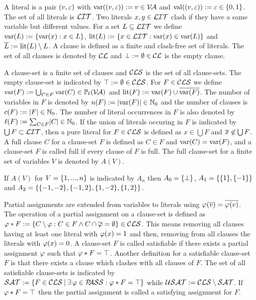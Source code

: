 \documentclass[]{book}
\begin{document}
A literal is a pair $(v,\varepsilon)$ with $\operatorname{var}((v,\varepsilon)):=v \in \mathcal{V\hspace{-0.1em}A}$ and $\operatorname{val}((v,\varepsilon)):=\varepsilon \in \{0,1\}$. The set of all literals is $\mathcal{LIT}$. Two literals $x, y \in \mathcal{LIT}$ clash if they have a same variable but different values. For a set $L \subseteq \mathcal{LIT}$ we define $\operatorname{var}(L) := \{ \operatorname{var}(x) : x \in L \}$, $\operatorname{lit}(L):= \{ x \in \mathcal{LIT} : \operatorname{var}(x) \in \operatorname{var}(L) \}$ and $\overline{L} := \operatorname{lit}(L) \setminus L$. A clause is defined as a finite and clash-free set of literals. The set of all clauses is denoted by $\mathcal{CL}$ and $\bot := \emptyset \in \mathcal{CL}$ is the empty clause. 

A clause-set is a finite set of clauses and $\mathcal{CLS}$ is the set of all clause-sets. The empty clause-set is indicated by $\top := \emptyset \in \mathcal{CLS}$. For $F \in \mathcal{CLS}$ we define $\operatorname{var}(F) := \bigcup_{C \in F} \operatorname{var}(C) \in \operatorname{\mathbb{P}_f}(\mathcal{V\hspace{-0.1em}A})$ and $\operatorname{lit}(F) := \operatorname{var}(F) \cup \overline{\operatorname{var}(F)}$. The number of variables in $F$ is denoted by $n(F) := \lvert \operatorname{var}(F) \rvert \in \mathbb{N}_0$ and the number of clauses is $c(F) := \lvert F \rvert \in \mathbb{N}_0$. The number of literal occurrences in $F$ is also denoted by $\ell(F) := \sum_{C \in F} \lvert C \rvert \in \mathbb{N}_0$. If the union of literals occuring in $F$ is indicated by $\bigcup F \subset \mathcal{LIT}$, then a pure literal for $F \in \mathcal{CLS}$ is defined as $x \in \bigcup F$ and $\overline{x} \not \in \bigcup F$. A full clause $C$  for a clause-set $F$ is defined as $C \in F$ and $\operatorname{var}(C) = \operatorname{var}(F)$, and a clause-set $F$ is called full if every clause of $F$ is full. The full clause-set for a finite set of variables $V$ is denoted by $A(V)$. 

\begin{examp}\label{exp:An}
  If $A(V)$ for $V=\{ 1,..., n \}$ is indicated by $A_n$ then $A_0 = \{ \bot \}$, $A_1 = \{ \{ 1 \},\{ -1 \} \}$ and $A_2 = \{ \{ -1,-2 \},\{ -1,2 \},\{ 1,-2 \},\{ 1,2 \} \}$.
\end{examp}

Partial assignments are extended from variables to literals using $\varphi(\overline{v})=\overline{\varphi(v)}$. The operation of a partial assignment on a clause-set is defined as $\varphi * F := \{ C \setminus \varphi : C \in F \wedge C \cap \overline{\varphi} = \emptyset \} \in \mathcal{CLS}$. This means removing all clauses having at least one literal with $\varphi (x)=1$ and then, removing from all clauses the literals with $\varphi (x)=0$. A clause-set $F$ is called satisfiable if there exists a partial assignment $\varphi$ such that $\varphi * F = \top$. Another definition for a satisfiable clause-set $F$ is that there exists a clause which clashes with all clauses of $F$. The set of all satisfiable clause-sets is indicated by $\mathcal{SAT} := \{ F \in \mathcal{CLS} {\:|\:} \exists\, \varphi \in \mathcal{P\hspace{-0.32em}ASS} : \varphi * F = \top \}$ while $\mathcal{USAT} := \mathcal{CLS} \setminus \mathcal{SAT}$. If $\varphi * F = \top$ then the partial assignment is called a satisfying assignment for $F$.
\end{document}
